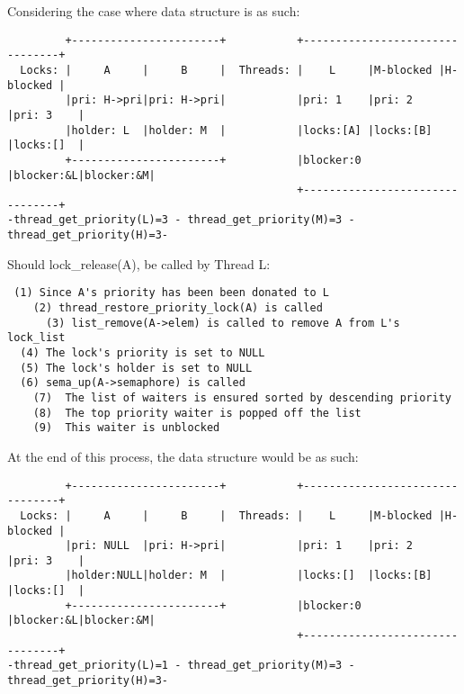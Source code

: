 \documentclass[a4wide, 11pt]{article}
\begin{document}
Considering the case where data structure is as such:

\begin{verbatim}
         +-----------------------+           +--------------------------------+
  Locks: |     A     |     B     |  Threads: |    L     |M-blocked |H-blocked |
         |pri: H->pri|pri: H->pri|           |pri: 1    |pri: 2    |pri: 3    |
         |holder: L  |holder: M  |           |locks:[A] |locks:[B] |locks:[]  |
         +-----------------------+           |blocker:0 |blocker:&L|blocker:&M|
                                             +--------------------------------+
-thread_get_priority(L)=3 - thread_get_priority(M)=3 - thread_get_priority(H)=3-
\end{verbatim}

Should lock\_release(A), be called by Thread L:
\begin{verbatim}
 (1) Since A's priority has been been donated to L
    (2) thread_restore_priority_lock(A) is called
      (3) list_remove(A->elem) is called to remove A from L's lock_list
  (4) The lock's priority is set to NULL
  (5) The lock's holder is set to NULL
  (6) sema_up(A->semaphore) is called
    (7)  The list of waiters is ensured sorted by descending priority
    (8)  The top priority waiter is popped off the list
    (9)  This waiter is unblocked
\end{verbatim}

At the end of this process, the data structure would be as such:

\begin{verbatim}
         +-----------------------+           +--------------------------------+
  Locks: |     A     |     B     |  Threads: |    L     |M-blocked |H-blocked |
         |pri: NULL  |pri: H->pri|           |pri: 1    |pri: 2    |pri: 3    |
         |holder:NULL|holder: M  |           |locks:[]  |locks:[B] |locks:[]  |
         +-----------------------+           |blocker:0 |blocker:&L|blocker:&M|
                                             +--------------------------------+
-thread_get_priority(L)=1 - thread_get_priority(M)=3 - thread_get_priority(H)=3-
\end{verbatim}
\end{document}
